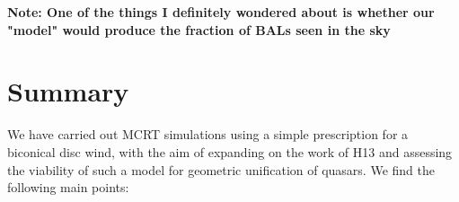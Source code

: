\documentclass[preprint, a4paper, 11pt]{aastex}
\begin{document}




{\bf Note: One of the things I definitely wondered about is whether our "model" would produce the fraction of BALs seen in the sky}





\section{Summary}

We have carried out MCRT simulations using a simple
prescription for a biconical disc wind, with
the aim of expanding on the work of H13 and assessing 
the viability of such a model for geometric unification of quasars.
We find the following main points:
\end{document}
